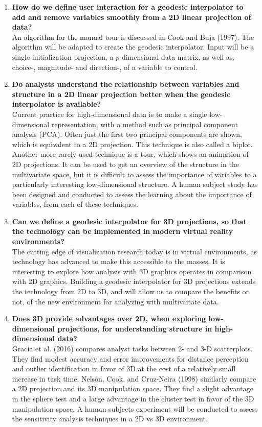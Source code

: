 \documentclass[
  11,
]{article}
\begin{document}
\begin{enumerate}
\def\labelenumi{\arabic{enumi}.}
\item
  \textbf{How do we define user interaction for a geodesic interpolator to add and remove variables smoothly from a 2D linear projection of data?}\\
  An algorithm for the manual tour is discussed in Cook and Buja (1997). The algorithm will be adapted to create the geodesic interpolator. Input will be a single initialization projection, a \(p\)-dimensional data matrix, as well as, choice-, magnitude- and direction-, of a variable to control.
\item
  \textbf{Do analysts understand the relationship between variables and structure in a 2D linear projection better when the geodesic interpolator is available?}\\
  Current practice for high-dimensional data is to make a single low-dimensional representation, with a method such as principal component analysis (PCA). Often just the first two principal components are shown, which is equivalent to a 2D projection. This technique is also called a biplot. Another more rarely used technique is a tour, which shows an animation of 2D projections. It can be used to get an overview of the structure in the multivariate space, but it is difficult to assess the importance of variables to a particularly interesting low-dimensional structure. A human subject study has been designed and conducted to assess the learning about the importance of variables, from each of these techniques.
\item
  \textbf{Can we define a geodesic interpolator for 3D projections, so that the technology can be implemented in modern virtual reality environments?}\\
  The cutting edge of visualization research today is in virtual environments, as technology has advanced to make this accessible to the masses. It is interesting to explore how analysis with 3D graphics operates in comparison with 2D graphics. Building a geodesic interpolator for 3D projections extends the technology from 2D to 3D, and will allow us to compare the benefits or not, of the new environment for analyzing with multivariate data.
\item
  \textbf{Does 3D provide advantages over 2D, when exploring low-dimensional projections, for understanding structure in high-dimensional data? }\\
  Gracia et al. (2016) compares analyst tasks between 2- and 3-D scatterplots. They find modest accuracy and error improvements for distance perception and outlier identification in favor of 3D at the cost of a relatively small increase in task time. Nelson, Cook, and Cruz-Neira (1998) similarly compare a 2D projection and its 3D manipulation space. They find a slight advantage in the sphere test and a large advantage in the cluster test in favor of the 3D manipulation space. A human subjects experiment will be conducted to assess the sensitivity analysis techniques in a 2D vs 3D environment.
\end{enumerate}
\end{document}

